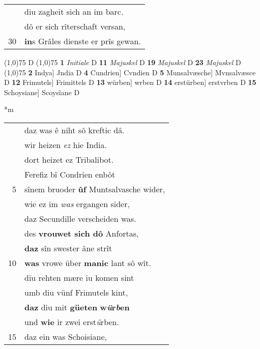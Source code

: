 \documentclass[8pt,a4paper,notitlepage]{article}
\begin{document}
\begin{table}[ht]
\begin{minipage}[t]{0.5\linewidth}
\begin{tabular}{rl}
 & diu zagheit sich an im barc.\\ 
 & dô er sich rîterschaft versan,\\ 
30 & \textbf{in}s Grâles dienste er prîs gewan.\\ 
\end{tabular}
\scriptsize
\line(1,0){75} \newline
D \newline
\line(1,0){75} \newline
\textbf{1} \textit{Initiale} D  \textbf{11} \textit{Majuskel} D  \textbf{19} \textit{Majuskel} D  \textbf{23} \textit{Majuskel} D  \newline
\line(1,0){75} \newline
\textbf{2} Indya] Jndia D \textbf{4} Cundrien] Cvndien D \textbf{5} Munsalvæsche] Mvnsalvæsce D \textbf{12} Frimutels] Frimittels D \textbf{13} würben] wrben D \textbf{14} erstürben] erstvrben D \textbf{15} Schoysiane] Scoysîane D \newline
\end{minipage}
\hspace{0.5cm}
\begin{minipage}[t]{0.5\linewidth}
\small
\begin{center}*m
\end{center}
\begin{tabular}{rl}
 & daz was ê niht sô kreftic dâ.\\ 
 & wir heizen \textit{ez} hie India.\\ 
 & dort heizet ez Tribalibot.\\ 
 & Ferefiz bî Condrien enbôt\\ 
5 & sînem bruoder \textbf{ûf} Muntsalvasche wider,\\ 
 & wie ez im \textit{was} ergangen sider,\\ 
 & daz Secundille verscheiden was.\\ 
 & des \textbf{vrouwet sich dô} Anfortas,\\ 
 & \textbf{daz} sîn swester âne strît\\ 
10 & \textbf{was} vrowe über \textbf{manic} lant sô wît.\\ 
 & diu rehten mære iu komen sint\\ 
 & umb diu vünf Frimutels kint,\\ 
 & \textbf{daz} diu mit \textbf{güeten} \textbf{w\textit{ü}r\textit{b}en}\\ 
 & und \textbf{wie} ir zwei erst\textit{ü}rben.\\ 
15 & daz ein was Schoisiane,\\ 

\end{tabular}
\end{minipage}
\end{table}
\end{document}
